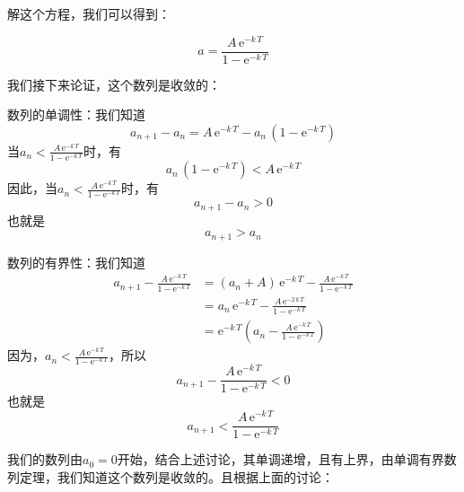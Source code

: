 \documentclass[12pt,AutoFakeSlant,AutoFakeBold]{article}
\begin{document}
解这个方程，我们可以得到：

\begin{equation}
    a = \frac{A\,\mathrm{e}^{-k\,T}}{1 - \mathrm{e}^{-k\,T}}
\end{equation}

我们接下来论证，这个数列是收敛的：

\begin{enumerate*}
    \item 数列的单调性：我们知道
    \begin{equation}
        a_{n+1}-a_n = A\,\mathrm{e}^{-k\,T} - a_n\,(1 - \mathrm{e}^{-k\,T})
    \end{equation}
    当$a_n < \frac{A\,\mathrm{e}^{-k\,T}}{1 - \mathrm{e}^{-k\,T}}$时，有
    \begin{equation}
        a_n\,(1 - \mathrm{e}^{-k\,T}) < A\,\mathrm{e}^{-k\,T}
    \end{equation}
    因此，当$a_n < \frac{A\,\mathrm{e}^{-k\,T}}{1 - \mathrm{e}^{-k\,T}}$时，有
    \begin{equation}
        a_{n+1}-a_n > 0
    \end{equation}
    也就是
    \begin{equation}
        a_{n+1} > a_n
    \end{equation}
    \item 数列的有界性：我们知道
    \begin{align}
        a_{n+1} - \frac{A\,\mathrm{e}^{-k\,T}}{1 - \mathrm{e}^{-k\,T}} &= (a_n + A)\,\mathrm{e}^{-k\,T} - \frac{A\,\mathrm{e}^{-k\,T}}{1 - \mathrm{e}^{-k\,T}}\\
        &= a_n\,\mathrm{e}^{-k\,T} - \frac{A\,\mathrm{e}^{-2\,k\,T}}{1-\mathrm{e}^{-k\,T}}\\
        &= \mathrm{e}^{-k\,T}\left( a_n - \frac{A\,\mathrm{e}^{-k\,T}}{1 - \mathrm{e}^{-k\,T}}\right)
    \end{align}
    因为，$a_n < \frac{A\,\mathrm{e}^{-k\,T}}{1 - \mathrm{e}^{-k\,T}}$，所以
    \begin{equation}
        a_{n+1} - \frac{A\,\mathrm{e}^{-k\,T}}{1 - \mathrm{e}^{-k\,T}} < 0
    \end{equation}
    也就是
    \begin{equation}
        a_{n+1} < \frac{A\,\mathrm{e}^{-k\,T}}{1 - \mathrm{e}^{-k\,T}}
    \end{equation}
    \item 我们的数列由$a_0 = 0$开始，结合上述讨论，其单调递增，且有上界，由单调有界数列定理，我们知道这个数列是收敛的。且根据上面的讨论：
\end{enumerate*}
\end{document}
